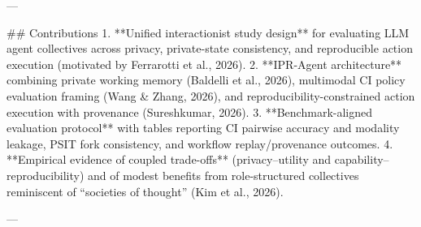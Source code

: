 ---

## Contributions  
1. **Unified interactionist study design** for evaluating LLM agent collectives across privacy, private-state consistency, and reproducible action execution (motivated by Ferrarotti et al., 2026).  
2. **IPR-Agent architecture** combining private working memory (Baldelli et al., 2026), multimodal CI policy evaluation framing (Wang & Zhang, 2026), and reproducibility-constrained action execution with provenance (Sureshkumar, 2026).  
3. **Benchmark-aligned evaluation protocol** with tables reporting CI pairwise accuracy and modality leakage, PSIT fork consistency, and workflow replay/provenance outcomes.  
4. **Empirical evidence of coupled trade-offs** (privacy–utility and capability–reproducibility) and of modest benefits from role-structured collectives reminiscent of “societies of thought” (Kim et al., 2026).

---